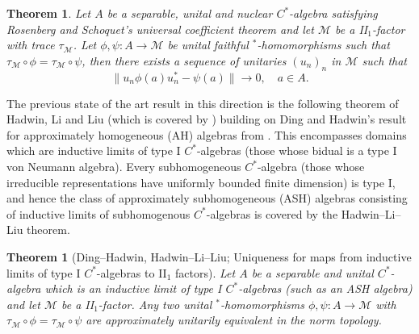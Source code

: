 \documentclass[reqno]{amsart}
\newtheorem{mainthm}{Theorem}
\newtheorem*{theorem*}{Theorem}
\theoremstyle{definition}
\theoremstyle{remark}
\numberwithin{equation}{section}
\theoremstyle{definition}
\newcommand{\calM}{\mathcal{M}}
\begin{document}
\begin{mainthm} 
\label{II1_factor:intro} 
Let $A$ be a separable, unital and nuclear $C^*$-algebra satisfying Rosenberg and Schoquet's universal coefficient theorem and let $\calM$ be a II$_{1}$-factor with trace $\tau_{\calM}$. Let $\phi, \psi: A\rightarrow \calM$ be unital faithful $^*$-homomorphisms such that $\tau_{\calM} \circ \phi = \tau_{\calM} \circ \psi$, then there exists a sequence of unitaries $(u_{n})_{n}$ in $\calM$ such that 
\begin{equation}\label{II1_factor.1} 
\|u_n \phi(a)u_n^*-\psi(a)\|\to 0, \quad a\in A. 
\end{equation} 
\end{mainthm} 

The previous state of the art result in this direction is the following theorem of Hadwin, Li and Liu (which is covered by \cite[Theorem 5]{LHL:OM}) building on Ding and Hadwin's result for approximately homogeneous (AH) algebras from \cite{DingHadwin}.  This encompasses domains which are inductive limits of type I $C^*$-algebras (those whose bidual is a type I von Neumann algebra). Every subhomogeneous $C^*$-algebra (those whose irreducible representations have uniformly bounded finite dimension) is type I, and hence the class of approximately subhomogeneous (ASH) algebras consisting of inductive limits of subhomogenous $C^*$-algebras is covered by the Hadwin--Li--Liu theorem.

\begin{theorem*}[Ding--Hadwin, Hadwin--Li--Liu; Uniqueness for maps from inductive limits of type I $C^*$-algebras to II$_1$ factors]
    Let $A$ be a separable and unital $C^*$-algebra which is an inductive limit of type I $C^*$-algebras (such as an ASH algebra) and let $\mathcal M$ be a II$_1$-factor.  Any two unital $^*$-homomorphisms $\phi,\psi\colon A\to\mathcal M$ with $\tau_\mathcal M\circ\phi=\tau_\mathcal M\circ\psi$ are approximately unitarily equivalent in the norm topology. 
\end{theorem*} 
\end{document}

